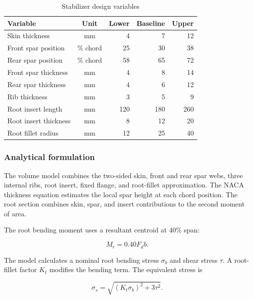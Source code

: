 \begin{table}[H]
\centering
\caption{Stabilizer design variables}
\label{tab:stabilizer-parameters}
\begin{tabularx}{\textwidth}{Xcrrr}
\toprule
\textbf{Variable} & \textbf{Unit} & \textbf{Lower} & \textbf{Baseline} &
\textbf{Upper}\\
\midrule
Skin thickness & mm & 4 & 7 & 12\\
Front spar position & \% chord & 25 & 30 & 38\\
Rear spar position & \% chord & 58 & 65 & 72\\
Front spar thickness & mm & 4 & 8 & 14\\
Rear spar thickness & mm & 4 & 6 & 12\\
Rib thickness & mm & 3 & 5 & 9\\
Root insert length & mm & 120 & 180 & 260\\
Root insert thickness & mm & 8 & 12 & 20\\
Root fillet radius & mm & 12 & 25 & 40\\
\bottomrule
\end{tabularx}
\end{table}

\subsubsection{Analytical formulation}
\label{sec:stabilizer-model}

The volume model combines the two-sided skin, front and rear spar webs, three
internal ribs, root insert, fixed flange, and root-fillet approximation. The
NACA thickness equation estimates the local spar height at each chord
position. The root section combines skin, spar, and insert contributions to
the second moment of area.

The root bending moment uses a resultant centroid at 40\% span:

\begin{equation}
M_r=0.40F_db.
\label{eq:stabilizer-moment}
\end{equation}

The model calculates a nominal root bending stress $\sigma_b$ and shear stress
$\tau$. A root-fillet factor $K_t$ modifies the bending term. The equivalent
stress is

\begin{equation}
\sigma_s=
\sqrt{(K_t\sigma_b)^2+3\tau^2}.
\label{eq:stabilizer-stress}
\end{equation}

